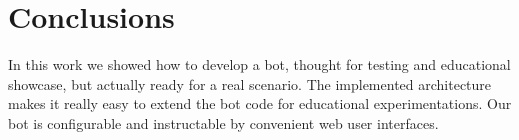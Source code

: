 \section{Conclusions}
\label{sec:conclusions}

In this work we showed how to develop a bot, thought for testing and educational showcase, but actually ready for a real scenario.
The implemented architecture makes it really easy to extend the bot code for educational experimentations. 
Our bot is configurable and instructable by convenient web user interfaces.
